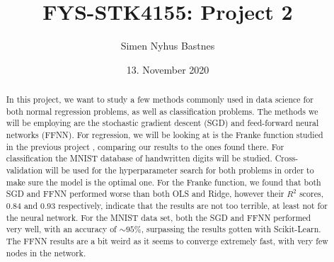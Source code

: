 \documentclass[a4paper]{article}
\title{FYS-STK4155: Project 2}
\author{Simen Nyhus Bastnes}
\date{13. November 2020}
\begin{document}
\maketitle
\begin{abstract}
In this project, we want to study a few methods commonly used in data science for both normal regression problems, as well as classification problems. The methods we will be employing are the stochastic gradient descent (SGD) and feed-forward neural networks (FFNN). For regression, we will be looking at is the Franke function studied in the previous project \cite{Github1}, comparing our results to the ones found there. For classification the MNIST database of handwritten digits will be studied. Cross-validation will be used for the hyperparameter search for both problems in order to make sure the model is the optimal one.
%
For the Franke function, we found that both SGD and FFNN performed worse than both OLS and Ridge, however their $R^2$ scores, $0.84$ and $0.93$ respectively, indicate that the results are not too terrible, at least not for the neural network.
%
For the MNIST data set, both the SGD and FFNN performed very well, with an accuracy of $\sim 95$\%, surpassing the results gotten with Scikit-Learn. The FFNN results are a bit weird as it seems to converge extremely fast, with very few nodes in the network.

\end{abstract}
\end{document}
